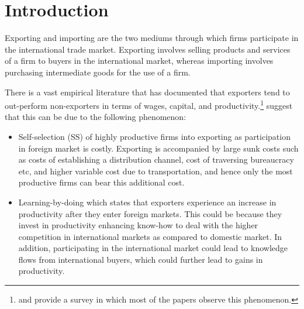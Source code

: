 \documentclass[12pt]{article}
\begin{document}
%

\newpage
\small

\tableofcontents

\newpage
{}
\section{Introduction}\label{sec:introduction}

Exporting and importing are the two mediums through which firms
participate in the international trade market. Exporting involves
selling products and services of a firm to buyers in the international
market, whereas importing involves purchasing intermediate goods for
the use of a firm.  


There is a vast empirical literature  that has documented that exporters tend to
out-perform non-exporters  in terms of wages, capital, and
productivity.\footnote{\textcite{wagner2007exports} and
  \textcite{bernard2007firms} provide a  survey in which most of the
  papers observe this phenomenon.} \textcite{bernard1999exceptional}  suggest that this can be due
to the following phenomenon:
\begin{itemize}
\item Self-selection (SS) of highly productive firms into exporting as  
participation in foreign market is costly. Exporting is accompanied by large
sunk costs
such as costs of establishing a distribution channel,
cost of traversing bureaucracy etc, and higher variable cost due to 
transportation, and hence only the most productive firms can bear this
additional cost. 
\item Learning-by-doing which states that exporters experience an
  increase in productivity after they enter foreign markets. This
  could be because  they invest in productivity enhancing know-how
 to deal with the higher competition in international markets as compared to
domestic market. In addition, participating in the
international market could lead to knowledge flows from international
buyers, which could further lead to gains in productivity.
\end{itemize}
\end{document}
